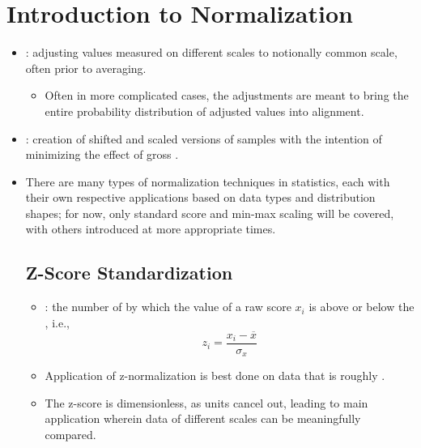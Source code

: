 \section{Introduction to Normalization}
\begin{itemize}
  \item {}: adjusting values measured on different scales to notionally common scale, often prior to averaging.
    \begin{itemize}
      \item Often in more complicated cases, the adjustments are meant to bring the entire probability distribution of adjusted values into alignment.
    \end{itemize}
  \item {}: creation of shifted and scaled versions of samples with the intention of minimizing the effect of gross \hyperref[Subsection: Outliers]{}.
  \item There are many types of normalization techniques in statistics, each with their own respective applications based on data types and distribution shapes; for now, only standard score and min-max scaling will be covered, with others introduced at more appropriate times.

  \subsection{Z-Score Standardization}
  \begin{itemize}
    \item {}: the number of \hyperref[Subsection: Measures of Dispersion]{} by which the value of a raw score \(x_i\) is above or below the \hyperref[Subsection: Measures of Central Tendency]{}, i.e., 
    \[%
    z_i = \frac{x_i - \overline{x}}{\sigma_x}
    \]%
    \item Application of z-normalization is best done on data that is roughly \hyperref[Subsection: Probability Distributions]{}. 
    \item The z-score is dimensionless, as units cancel out, leading to main application wherein data of different scales can be meaningfully compared. 
  \end{itemize}


\end{itemize}
